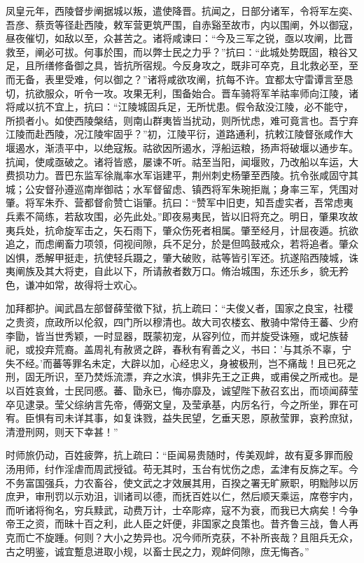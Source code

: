 \documentclass[12pt,UTF8]{ctexbook}
\begin{document}
凤皇元年，西陵督步阐据城以叛，遣使降晋。抗闻之，日部分诸军，令将军左奕、吾彦、蔡贡等径赴西陵，敕军营更筑严围，自赤谿至故市，内以围阐，外以御寇，昼夜催切，如敌以至，众甚苦之。诸将咸谏曰：“今及三军之锐，亟以攻阐，比晋救至，阐必可拔。何事於围，而以弊士民之力乎？”抗曰：“此城处势既固，粮谷又足，且所缮修备御之具，皆抗所宿规。今反身攻之，既非可卒克，且北救必至，至而无备，表里受难，何以御之？”诸将咸欲攻阐，抗每不许。宜都太守雷谭言至恳切，抗欲服众，听令一攻。攻果无利，围备始合。晋车骑将军羊祜率师向江陵，诸将咸以抗不宜上，抗曰：“江陵城固兵足，无所忧患。假令敌没江陵，必不能守，所损者小。如使西陵槃结，则南山群夷皆当扰动，则所忧虑，难可竟言也。吾宁弃江陵而赴西陵，况江陵牢固乎？”初，江陵平衍，道路通利，抗敕江陵督张咸作大堰遏水，渐渍平中，以绝寇叛。祜欲因所遏水，浮船运粮，扬声将破堰以通步车。抗闻，使咸亟破之。诸将皆惑，屡谏不听。祜至当阳，闻堰败，乃改船以车运，大费损功力。晋巴东监军徐胤率水军诣建平，荆州刺史杨肇至西陵。抗令张咸固守其城；公安督孙遵巡南岸御祜；水军督留虑、镇西将军朱琬拒胤；身率三军，凭围对肇。将军朱乔、营都督俞赞亡诣肇。抗曰：“赞军中旧吏，知吾虚实者，吾常虑夷兵素不简练，若敌攻围，必先此处。”即夜易夷民，皆以旧将充之。明日，肇果攻故夷兵处，抗命旋军击之，矢石雨下，肇众伤死者相属。肇至经月，计屈夜遁。抗欲追之，而虑阐畜力项领，伺视间隙，兵不足分，於是但鸣鼓戒众，若将追者。肇众凶惧，悉解甲挺走，抗使轻兵蹑之，肇大破败，祜等皆引军还。抗遂陷西陵城，诛夷阐族及其大将吏，自此以下，所请赦者数万口。脩治城围，东还乐乡，貌无矜色，谦冲如常，故得将士欢心。

加拜都护。闻武昌左部督薛莹徵下狱，抗上疏曰：“夫俊乂者，国家之良宝，社稷之贵资，庶政所以伦叙，四门所以穆清也。故大司农楼玄、散骑中常侍王蕃、少府李勖，皆当世秀颖，一时显器，既蒙初宠，从容列位，而并旋受诛殛，或圮族替祀，或投弃荒裔。盖周礼有赦贤之辟，春秋有宥善之义，书曰：'与其杀不辜，宁失不经。'而蕃等罪名未定，大辟以加，心经忠义，身被极刑，岂不痛哉！且已死之刑，固无所识，至乃焚烁流漂，弃之水滨，惧非先王之正典，或甫侯之所戒也。是以百姓哀耸，士民同慼。蕃、勖永已，悔亦靡及，诚望陛下赦召玄出，而顷闻薛莹卒见逮录。莹父综纳言先帝，傅弼文皇，及莹承基，内厉名行，今之所坐，罪在可宥。臣惧有司未详其事，如复诛戮，益失民望，乞垂天恩，原赦莹罪，哀矜庶狱，清澄刑网，则天下幸甚！”

时师旅仍动，百姓疲弊，抗上疏曰：“臣闻易贵随时，传美观衅，故有夏多罪而殷汤用师，纣作淫虐而周武授钺。苟无其时，玉台有忧伤之虑，孟津有反旆之军。今不务富国强兵，力农畜谷，使文武之才效展其用，百揆之署无旷厥职，明黜陟以厉庶尹，审刑罚以示劝沮，训诸司以德，而抚百姓以仁，然后顺天乘运，席卷宇内，而听诸将徇名，穷兵黩武，动费万计，士卒彫瘁，寇不为衰，而我已大病矣！今争帝王之资，而昧十百之利，此人臣之奸便，非国家之良策也。昔齐鲁三战，鲁人再克而亡不旋踵。何则？大小之势异也。况今师所克获，不补所丧哉？且阻兵无众，古之明鉴，诚宜蹔息进取小规，以畜士民之力，观衅伺隙，庶无悔吝。”
\end{document}
